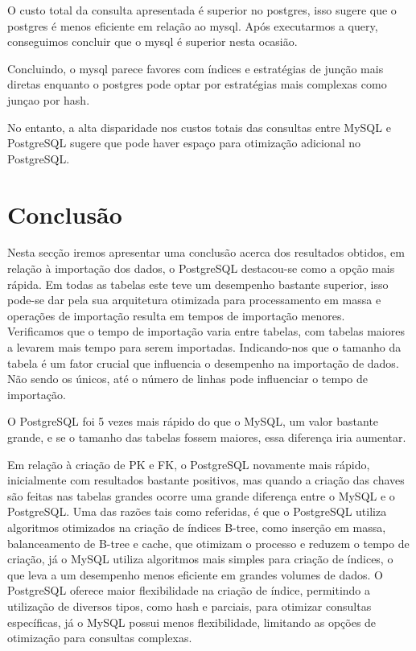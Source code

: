 \documentclass{article}
\begin{document}
O custo total da consulta apresentada é superior no postgres, isso sugere que o postgres é menos eficiente em relação ao mysql. Após executarmos a query, conseguimos concluir que o mysql é superior nesta ocasião.

Concluindo, o mysql parece favores com índices e estratégias de junção mais diretas enquanto o postgres pode optar por estratégias mais complexas como junçao por hash.

No entanto, a alta disparidade nos custos totais das consultas entre MySQL e PostgreSQL sugere que pode haver espaço para otimização adicional no PostgreSQL.
\clearpage
\section{Conclusão}

Nesta secção iremos apresentar uma conclusão acerca dos resultados obtidos, em relação à importação dos dados, o PostgreSQL destacou-se como a opção mais rápida. Em todas as tabelas este teve um desempenho bastante superior, isso pode-se dar pela sua arquitetura otimizada para processamento em massa e operações de importação resulta em tempos de importação menores. \\

Verificamos que o tempo de importação varia entre tabelas, com tabelas maiores a levarem mais tempo para serem importadas. Indicando-nos que o tamanho da tabela é um fator crucial que influencia o desempenho na importação de dados. Não sendo os únicos, até o número de linhas pode influenciar o tempo de importação.

O PostgreSQL foi 5 vezes mais rápido do que o MySQL, um valor bastante grande, e se o tamanho das tabelas fossem maiores, essa diferença iria aumentar.

Em relação à criação de PK e FK, o PostgreSQL novamente mais rápido, inicialmente com resultados bastante positivos, mas quando a criação das chaves são feitas nas tabelas grandes ocorre uma grande diferença entre o MySQL e o PostgreSQL. Uma das razões tais como referidas, é que o PostgreSQL utiliza algoritmos otimizados na criação de índices B-tree, como inserção em massa, balanceamento de B-tree e cache, que otimizam o processo e reduzem o tempo de criação, já o MySQL utiliza algoritmos mais simples para criação de índices, o que leva a um desempenho menos eficiente em grandes volumes de dados. O PostgreSQL oferece maior flexibilidade na criação de índice, permitindo a utilização de diversos tipos, como hash e parciais, para otimizar consultas específicas, já o MySQL possui menos flexibilidade, limitando as opções de otimização para consultas complexas.
\end{document}
